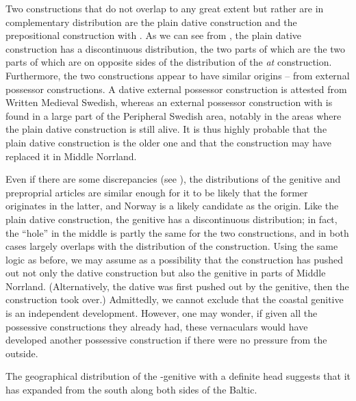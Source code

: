 Two constructions that do not overlap to any great extent but rather are in complementary distribution are the plain dative construction and the prepositional construction with . As we can see from , the plain dative construction has a discontinuous distribution, the two parts of which are the two parts of which are on opposite sides of the distribution of the \textit{at} construction. Furthermore, the two constructions appear to have similar origins – from external possessor constructions. A dative external possessor construction is attested from Written Medieval Swedish, whereas an external possessor construction with  is found in a large part of the Peripheral Swedish area, notably in the areas where the plain dative construction is still alive. It is thus highly probable that the plain dative construction is the older one and that the  construction may have replaced it in Middle Norrland. 

Even if there are some discrepancies (see ), the distributions of the genitive and preproprial articles are similar enough for it to be likely that the former originates in the latter, and Norway is a likely candidate as the origin. Like the plain dative construction, the genitive has a discontinuous distribution; in fact, the “hole” in the middle is partly the same for the two constructions, and in both cases largely overlaps with the distribution of the  construction. Using the same logic as before, we may assume as a possibility that the  construction has pushed out not only the dative construction but also the genitive in parts of Middle Norrland. (Alternatively, the dative was first pushed out by the genitive, then the construction took over.) Admittedly, we cannot exclude that the coastal genitive is an independent development. However, one may wonder, if given all the possessive constructions they already had, these vernaculars would have developed another possessive construction if there were no pressure from the outside.

The geographical distribution of the -genitive with a definite head suggests that it has expanded from the south along both sides of the Baltic. 

